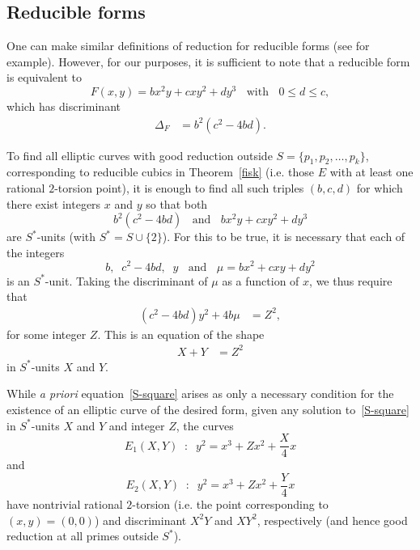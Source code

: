 \documentclass[11pt]{report}
\theoremstyle{definition}
\begin{document}

\subsection{Reducible forms}
\label{sec:reducible-forms}

One can make similar definitions of reduction for reducible forms (see \cite{BeGh} for example). However, for our
purposes, it is sufficient to note that a reducible form is equivalent to
$$
F(x,y) = b x^2 y + c x y^2 + d y^3 \; \; \mbox{ with }  \; \; 0 \leq d \leq c,
$$
which has discriminant
\begin{align*}
\Delta_F &= b^2 (c^2 - 4 b d).
\end{align*}

To find all elliptic curves with good reduction outside $S = \{ p_1, p_2, \ldots, p_k \}$, corresponding to
reducible cubics in Theorem~\ref{fisk} (i.e. those $E$ with at least one rational $2$-torsion point), it is enough to find all such triples $(b,c,d)$ for which there exist integers $x$ and $y$ so that both
$$
b^2(c^2-4bd) \; \; \mbox{ and } \; \;  b x^2 y + c x y^2 + d y^3
$$
are $S^*$-units (with $S^* = S \cup \{ 2 \}$). For this to be true, it is necessary that each of the integers
$$
b, \;  \; c^2 - 4 bd,\;  \; y \; \; \mbox{ and } \; \;  \mu = bx^2 + cxy + dy^2
$$
is an $S^*$-unit. Taking the discriminant of $\mu$ as a function of $x$, we thus require that
\begin{align} \label{weger}
(c^2 - 4 bd )  y^2  + 4 b \mu &=Z^2,
\end{align}
for some integer $Z$. This is an equation of the shape
\begin{align} \label{S-square}
 X+Y &=Z^2
\end{align}
in $S^*$-units $X$ and $Y$.

While \emph{a priori} equation~\eqref{S-square} arises as only a necessary condition for the existence
of an elliptic curve of the desired form, given any solution to~\eqref{S-square} in $S^*$-units $X$ and $Y$ and integer $Z$, the curves
$$
E_1(X,Y) \; \; : \; \; y^2 = x^3 + Z x^2 + \frac{X}{4} x
$$
and
$$
E_2(X,Y) \; \; : \; \; y^2 = x^3 + Z x^2 + \frac{Y}{4} x
$$
have nontrivial rational $2$-torsion (i.e. the point corresponding to $(x,y)=(0,0)$) and discriminant $X^2Y$ and $XY^2$, respectively (and hence good reduction at all primes outside $S^*$).

\end{document}
